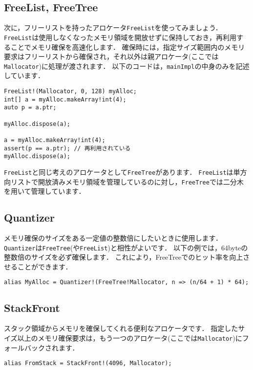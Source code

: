 \subsection{FreeList, FreeTree}

次に，フリーリストを持ったアロケータ\texttt{FreeList}を使ってみましょう．
\texttt{FreeList}は使用しなくなったメモリ領域を開放せずに保持しておき，再利用することでメモリ確保を高速化します．
確保時には，指定サイズ範囲内のメモリ要求はフリーリストから確保され，それ以外は親アロケータ(ここでは\texttt{Mallocator})に処理が渡されます．
以下のコードは，\texttt{mainImpl}の中身のみを記述しています．

\begin{lstlisting}
FreeList!(Mallocator, 0, 128) myAlloc;
int[] a = myAlloc.makeArray!int(4);
auto p = a.ptr;

myAlloc.dispose(a);

a = myAlloc.makeArray!int(4);
assert(p == a.ptr); // 再利用されている
myAlloc.dispose(a);
\end{lstlisting}

\texttt{FreeList}と同じ考えのアロケータとして\texttt{FreeTree}があります．
\texttt{FreeList}は単方向リストで開放済みメモリ領域を管理しているのに対し，\texttt{FreeTree}では二分木を用いて管理しています．


\subsection{Quantizer}

メモリ確保のサイズをある一定値の整数倍にしたいときに使用します．
\texttt{Quantizer}は\texttt{FreeTree}(や\texttt{FreeList})と相性がよいです．
以下の例では，64byteの整数倍のサイズを必ず確保します．
これにより，FreeTreeでのヒット率を向上させることができます．

\begin{lstlisting}
alias MyAlloc = Quantizer!(FreeTree!Mallocator, n => (n/64 + 1) * 64);
\end{lstlisting}


\subsection{StackFront}

スタック領域からメモリを確保してくれる便利なアロケータです．
指定したサイズ以上のメモリ確保要求は，もう一つのアロケータ(ここでは\texttt{Mallocator})にフォールバックされます．

\begin{lstlisting}
alias FromStack = StackFront!(4096, Mallocator);
\end{lstlisting}


